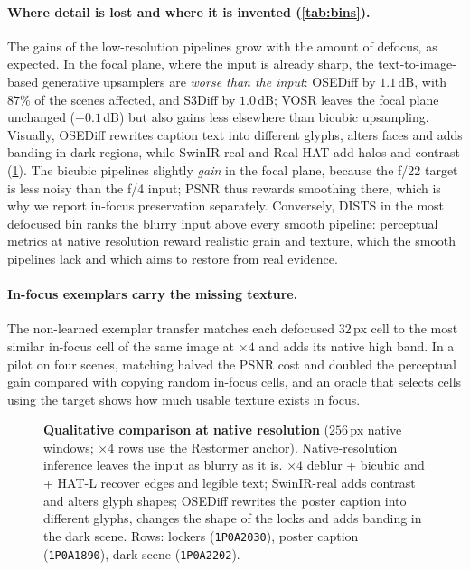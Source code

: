 \paragraph{Where detail is lost and where it is invented (\cref{tab:bins}).} The gains of the
low-resolution pipelines grow with the amount of defocus, as expected. In the focal plane, where the
input is already sharp, the text-to-image-based generative upsamplers are \emph{worse than the input}:
OSEDiff by $1.1$\,dB, with $87\%$ of the scenes affected, and S3Diff by $1.0$\,dB; VOSR leaves the focal
plane unchanged ($+0.1$\,dB) but also gains less elsewhere than bicubic upsampling. Visually, OSEDiff rewrites caption text into different
glyphs, alters faces and adds banding in dark regions, while SwinIR-real and Real-HAT add halos and
contrast (\cref{fig:qual}). The bicubic pipelines slightly \emph{gain} in the focal plane, because
the f/22 target is less noisy than the f/4 input; PSNR thus rewards smoothing there, which is why we
report in-focus preservation separately. Conversely, DISTS in the most defocused bin ranks the blurry
input above every smooth pipeline: perceptual metrics at native resolution reward realistic grain and
texture, which the smooth pipelines lack and which \method aims to restore from real evidence.

\paragraph{In-focus exemplars carry the missing texture.} The non-learned exemplar transfer matches
each defocused $32$\,px cell to the most similar in-focus cell of the same image at $\times4$ and adds
its native high band. In a pilot on four scenes, matching halved the PSNR cost and doubled the
perceptual gain compared with copying random in-focus cells, and an oracle that selects cells using the target shows how much usable
texture exists in focus. 

\begin{figure}[t]
  \centering
  
  \caption{\textbf{Qualitative comparison at native resolution} ($256$\,px native windows; $\times4$ rows use the
  Restormer anchor). Native-resolution inference leaves the input as blurry as it is. $\times4$ deblur + bicubic and + HAT-L
  recover edges and legible text; SwinIR-real adds contrast and alters glyph shapes; OSEDiff rewrites the poster caption
  into different glyphs, changes the shape of the locks and adds banding in the dark scene. Rows: lockers
  (\texttt{1P0A2030}), poster caption (\texttt{1P0A1890}), dark scene (\texttt{1P0A2202}).
  }
  \label{fig:qual}
\end{figure}

